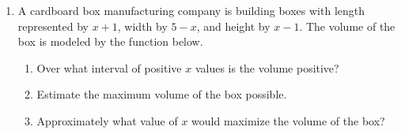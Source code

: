 \documentclass[12pt, twoside]{article}
\begin{document}
\begin{enumerate}
\newpage
\item A cardboard box manufacturing company is building boxes with length represented by $x+1$, width by $5-x$, and height by $x-1$. The volume of the box is modeled by the function below.
    \begin{center}
    \end{center}
    \begin{enumerate}[itemsep=1cm]
        \item Over what interval of positive $x$ values is the volume positive?
        \item Estimate the maximum volume of the box possible.
        \item Approximately what value of $x$ would maximize the volume of the box?
    \end{enumerate}


\end{enumerate}
\end{document}
